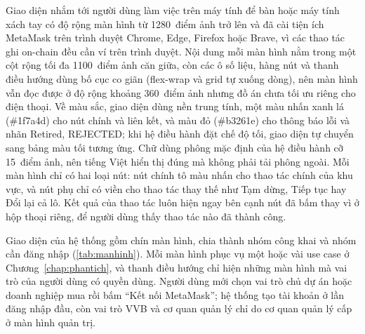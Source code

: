 Giao diện nhắm tới người dùng làm việc trên máy tính để bàn hoặc máy tính xách tay có độ rộng màn hình từ 1280~điểm ảnh trở lên và đã cài tiện ích MetaMask trên trình duyệt Chrome, Edge, Firefox hoặc Brave, vì các thao tác ghi on-chain đều cần ví trên trình duyệt. Nội dung mỗi màn hình nằm trong một cột rộng tối đa 1100~điểm ảnh căn giữa, còn các ô số liệu, hàng nút và thanh điều hướng dùng bố cục co giãn (flex-wrap và grid tự xuống dòng), nên màn hình vẫn đọc được ở độ rộng khoảng 360~điểm ảnh nhưng đồ án chưa tối ưu riêng cho điện thoại. Về màu sắc, giao diện dùng nền trung tính, một màu nhấn xanh lá (\#1f7a4d) cho nút chính và liên kết, và màu đỏ (\#b3261e) cho thông báo lỗi và nhãn Retired, REJECTED; khi hệ điều hành đặt chế độ tối, giao diện tự chuyển sang bảng màu tối tương ứng. Chữ dùng phông mặc định của hệ điều hành cỡ 15~điểm ảnh, nên tiếng Việt hiển thị đúng mà không phải tải phông ngoài. Mỗi màn hình chỉ có hai loại nút: nút chính tô màu nhấn cho thao tác chính của khu vực, và nút phụ chỉ có viền cho thao tác thay thế như Tạm dừng, Tiếp tục hay Đổi lại cả lô. Kết quả của thao tác luôn hiện ngay bên cạnh nút đã bấm thay vì ở hộp thoại riêng, để người dùng thấy thao tác nào đã thành công.

Giao diện của hệ thống gồm chín màn hình, chia thành nhóm công khai và nhóm cần đăng nhập (\autoref{tab:manhinh}). Mỗi màn hình phục vụ một hoặc vài use case ở Chương~\ref{chap:phantich}, và thanh điều hướng chỉ hiện những màn hình mà vai trò của người dùng có quyền dùng. Người dùng mới chọn vai trò chủ dự án hoặc doanh nghiệp mua rồi bấm ``Kết nối MetaMask''; hệ thống tạo tài khoản ở lần đăng nhập đầu, còn vai trò VVB và cơ quan quản lý chỉ do cơ quan quản lý cấp ở màn hình quản trị.

